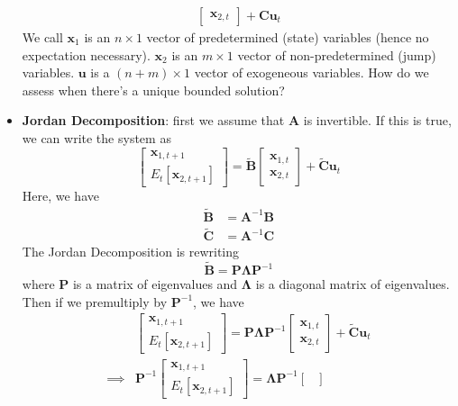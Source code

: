\documentclass[12pt]{article}
\begin{document}
\begin{itemize}
\[\begin{split}
\begin{bmatrix}
        \textbf{x}_{2,t}
        \end{bmatrix} + \textbf{C}\textbf{u}_t
    \end{split}\]
    We call $\textbf{x}_1$ is an $n\times 1$ vector of predetermined (state) variables (hence no expectation necessary). $\textbf{x}_2$ is an $m\times 1$ vector of non-predetermined (jump) variables. $\textbf{u}$ is a $(n+m) \times 1$ vector of exogeneous variables. How do we assess when there's a unique bounded solution?
    \item \textbf{Jordan Decomposition}: first we assume that $\textbf{A}$ is invertible. If this is true, we can write the system as
    \[\begin{bmatrix}
        \textbf{x}_{1,t+1} \\
        E_t[\textbf{x}_{2,t+1}]
        \end{bmatrix} = \boldsymbol{\widetilde{B}}\begin{bmatrix}
        \textbf{x}_{1,t}\\
        \textbf{x}_{2,t}
        \end{bmatrix} + \boldsymbol{\widetilde{C}}\textbf{u}_t
    \]
    Here, we have
    \[\begin{split}
        \boldsymbol{\widetilde{B}} &= \textbf{A}^{-1}\textbf{B} \\
        \boldsymbol{\widetilde{C}} &= \textbf{A}^{-1}\textbf{C}
    \end{split}\]
    The Jordan Decomposition is rewriting \[\boldsymbol{\widetilde{B}} = \textbf{P}\boldsymbol{\Lambda}\textbf{P}^{-1}\]
    where $\textbf{P}$ is a matrix of eigenvalues and $\boldsymbol{\Lambda}$ is a diagonal matrix of eigenvalues. Then if we premultiply by $\textbf{P}^{-1}$, we have
    \[\begin{split}
        &\begin{bmatrix}
        \textbf{x}_{1,t+1} \\
        E_t[\textbf{x}_{2,t+1}]
        \end{bmatrix} = \textbf{P}\boldsymbol{\Lambda}\textbf{P}^{-1}\begin{bmatrix}
        \textbf{x}_{1,t}\\
        \textbf{x}_{2,t}
        \end{bmatrix} + \boldsymbol{\widetilde{C}}\textbf{u}_t \\
        \implies &\textbf{P}^{-1}\begin{bmatrix}
        \textbf{x}_{1,t+1} \\
        E_t[\textbf{x}_{2,t+1}]
        \end{bmatrix} = \boldsymbol{\Lambda}\textbf{P}^{-1}\begin{bmatrix}

\end{bmatrix}
\end{split}\]
\end{itemize}
\end{document}
